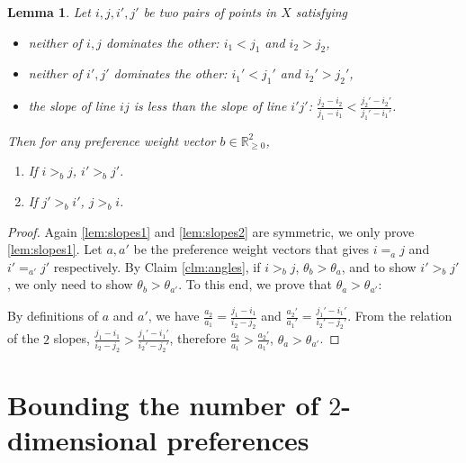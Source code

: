 \documentclass[12pt]{article}
\newtheorem{lemma}[theorem]{Lemma}
\newcommand{\1}[1]{\mathds{1}[{#1}]}
\begin{document}
    \begin{lemma} \label{lem:slopes}
      Let $i, j, i', j'$ be two pairs of points in $X$ satisfying
      \begin{itemize}
        \vspace{-5pt}
        \item neither of $i, j$ dominates the other: $i_1 < j_1$ and $i_2 > j_2$,
        \vspace{-5pt}
        \item neither of $i', j'$ dominates the other: $i_1' < j_1'$ and $i_2' > j_2'$,
        \vspace{-5pt}
        \item the slope of line $ij$ is less than the slope of line $i'j'$: 
        $\frac{j_2 - i_2}{j_1 - i_1} < \frac{j_2' - i_2'}{j_1' - i_1'}$.
      \end{itemize}
      \vspace{-5pt}
      Then for any preference weight vector $b \in \mathbb{R}_{\geq 0}^2$,
      \begin{enumerate}
        \vspace{-5pt}
        \item \label{lem:slopes1}
	  If $i >_b j$, $i' >_b j'$.
	\vspace{-5pt}
	\item \label{lem:slopes2}
	  If $j' >_b i'$, $j >_b i$.
      \end{enumerate}
    \end{lemma}
    \begin{proof}
      Again \ref{lem:slopes1} and \ref{lem:slopes2} are symmetric, 
      we only prove \ref{lem:slopes1}.
      Let $a, a'$ be the preference weight vectors that gives 
      $i =_a j$ and $i' =_{a'} j'$ respectively.
      By Claim \ref{clm:angles}, if $i >_b j$, $\theta_b > \theta_a$, 
      and to show $i' >_b j'$, we only need to show $\theta_b > \theta_{a'}$.
      To this end, we prove that $\theta_a > \theta_{a'}$:
      
      By definitions of $a$ and $a'$, 
      we have $\frac{a_2}{a_1} = \frac{j_1 - i_1}{i_2 - j_2}$ 
      and $\frac{a_2'}{a_1'} = \frac{j_1' - i_1'}{i_2' - j_2'}$.
      From the relation of the $2$ slopes, 
      $\frac{j_1 - i_1}{i_2 - j_2} > \frac{j_1' - i_1'}{i_2' - j_2'}$,
      therefore $\frac{a_2}{a_1} > \frac{a_2'}{a_1'}$, $\theta_a > \theta_{a'}$.
    \end{proof}
    

\section{Bounding the number of $2$-dimensional preferences}
\end{document}
